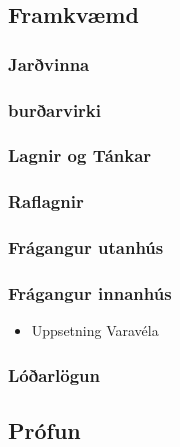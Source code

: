 \documentclass[11pt]{article}
\begin{document}
\subsection{Framkvæmd}
\label{sec-1.7}

\subsubsection{Jarðvinna}
\label{sec-1.7.1}

\subsubsection{burðarvirki}
\label{sec-1.7.2}

\subsubsection{Lagnir og Tánkar}
\label{sec-1.7.3}

\subsubsection{Raflagnir}
\label{sec-1.7.4}

\subsubsection{Frágangur utanhús}
\label{sec-1.7.5}

\subsubsection{Frágangur innanhús}
\label{sec-1.7.6}

\begin{itemize}

\item Uppsetning Varavéla\\
\label{sec-1.7.6.1}

\end{itemize} %
\subsubsection{Lóðarlögun}
\label{sec-1.7.7}


\subsection{Prófun}
\label{sec-1.8}
\end{document}
